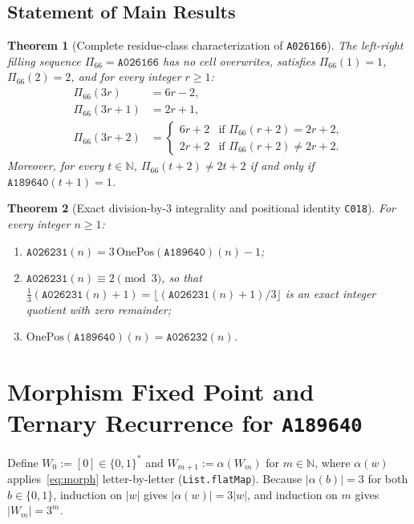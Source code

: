 \documentclass[11pt]{article}
\newtheorem{theorem}{Theorem}[section]
\theoremstyle{definition}
\newcommand{\N}{\mathbb{N}}
\newcommand{\seq}[1]{\texttt{#1}}
\newcommand{\OnePos}{\mathrm{OnePos}}
\begin{document}
\subsection{Statement of Main Results}

\begin{theorem}[Complete residue-class characterization of \seq{A026166}]
\label{thm:a026166}
The left-right filling sequence $\Pi_{66} = \seq{A026166}$ has no cell overwrites, satisfies $\Pi_{66}(1) = 1$, $\Pi_{66}(2) = 2$, and for every integer $r \ge 1$:
\begin{align}
\Pi_{66}(3r) &= 6r - 2, \label{eq:66-0} \\
\Pi_{66}(3r + 1) &= 2r + 1, \label{eq:66-1} \\
\Pi_{66}(3r + 2) &= \begin{cases}
6r + 2 & \text{if } \Pi_{66}(r + 2) = 2r + 2, \\
2r + 2 & \text{if } \Pi_{66}(r + 2) \ne 2r + 2.
\end{cases} \label{eq:66-2}
\end{align}
Moreover, for every $t \in \N$, $\Pi_{66}(t + 2) \ne 2t + 2$ if and only if $\seq{A189640}(t + 1) = 1$.
\end{theorem}

\begin{theorem}[Exact division-by-$3$ integrality and positional identity \texttt{C018}]
\label{thm:main}
For every integer $n \ge 1$:
\begin{enumerate}
\item[\textup{(a)}] $\seq{A026231}(n) = 3\,\OnePos(\seq{A189640})(n) - 1$;
\item[\textup{(b)}] $\seq{A026231}(n) \equiv 2 \pmod{3}$, so that $\frac{1}{3}(\seq{A026231}(n) + 1) = \lfloor (\seq{A026231}(n) + 1)/3 \rfloor$ is an exact integer quotient with zero remainder;
\item[\textup{(c)}] $\OnePos(\seq{A189640})(n) = \seq{A026232}(n)$.
\end{enumerate}
\end{theorem}

\section{Morphism Fixed Point and Ternary Recurrence for \seq{A189640}}
\label{sec:morph}

Define $W_0 := [0] \in \{0, 1\}^*$ and $W_{m+1} := \alpha(W_m)$ for $m \in \N$, where $\alpha(w)$ applies~\eqref{eq:morph} letter-by-letter (\texttt{List.flatMap}). Because $|\alpha(b)| = 3$ for both $b \in \{0, 1\}$, induction on $|w|$ gives $|\alpha(w)| = 3|w|$, and induction on $m$ gives $|W_m| = 3^m$.
\end{document}
